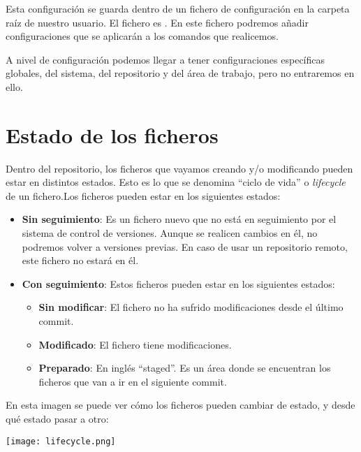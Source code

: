 Esta configuración se guarda dentro de un fichero de configuración en la carpeta raíz de nuestro usuario. El fichero es . En este fichero podremos añadir configuraciones que se aplicarán a los comandos que realicemos.

A nivel de configuración podemos llegar a tener configuraciones específicas globales, del sistema, del repositorio y del área de trabajo, pero no entraremos en ello.

\chapter{Estado de los ficheros}
Dentro del repositorio, los ficheros que vayamos creando y/o modificando pueden estar en distintos estados. Esto es lo que se denomina “ciclo de vida” o \textit{lifecycle} de un fichero.Los ficheros pueden estar en los siguientes estados:

\begin{itemize}
    \item \textbf{Sin seguimiento}: Es un fichero nuevo que no está en seguimiento por el sistema de control de versiones. Aunque se realicen cambios en él, no podremos volver a versiones previas. En caso de usar un repositorio remoto, este fichero no estará en él.

    \item \textbf{Con seguimiento}: Estos ficheros pueden estar en los siguientes estados:
    \begin{itemize}
        \item \textbf{Sin modificar}: El fichero no ha sufrido modificaciones desde el último commit.
        \item \textbf{Modificado}: El fichero tiene modificaciones.
        \item \textbf{Preparado}: En inglés “staged”. Es un área donde se encuentran los ficheros que van a ir en el siguiente commit.
    \end{itemize}
\end{itemize}

En esta imagen se puede ver cómo los ficheros pueden cambiar de estado, y desde qué estado pasar a otro:

\begin{center}
    \texttt{[image: lifecycle.png]}
\end{center}

